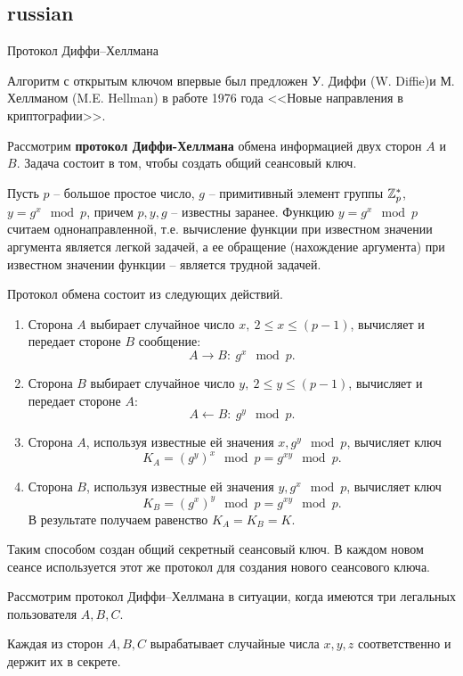 \subsection{russian}{Протокол Диффи--Хеллмана}

Алгоритм с открытым ключом впервые был предложен У. Диффи (W. Diffie)и М. Хеллманом (M.E. Hellman) в работе 1976 года <<Новые направления в криптографии>>.

Рассмотрим \textbf{протокол Диффи-Хеллмана} обмена информацией  двух сторон $A$ и $B$. Задача состоит в том, чтобы создать общий сеансовый ключ.

Пусть $p$ -- большое простое число, $g$ -- примитивный элемент группы $\mathbb{Z}_p^*$, ~ $y = g^x \mod p$, причем $p,y,g$ -- известны заранее. Функцию $y=g^{x} \mod p$ считаем однонаправленной, т.е. вычисление функции при известном значении аргумента является легкой задачей, а ее обращение (нахождение аргумента) при известном значении функции -- является трудной задачей.

Протокол обмена состоит из следующих действий.
\begin{enumerate}
    \item Сторона $A$ выбирает случайное число $x, ~ 2 \leq x \leq (p-1)$, вычисляет и передает стороне $B$ сообщение:
        \[ A \rightarrow B: ~ g^x \mod p. \]
    \item Сторона $B$ выбирает случайное число $y, ~ 2\leq y \leq (p-1)$, вычисляет и передает стороне $A$:
        \[ A \leftarrow B: ~ g^y \mod p. \]
    \item Сторона $A$, используя известные ей значения $x,g^{y} \mod p$, вычисляет ключ
        \[ K_{A} =(g^{y})^{x}\mod p=g^{xy} \mod p. \]
    \item Сторона $B$, используя известные ей значения $y,g^{x} \mod p$, вычисляет ключ
        \[ K_{B} =(g^{x})^{y}\mod p=g^{xy}\mod p. \]
        В результате получаем равенство  $K_A = K_B = K$.
\end{enumerate}

Таким способом создан общий секретный сеансовый ключ. В каждом новом сеансе используется этот же протокол для создания нового сеансового ключа.

Рассмотрим протокол Диффи--Хеллмана в ситуации, когда имеются три легальных пользователя $A,B,C$.

Каждая из сторон $A,B,C$ вырабатывает случайные числа $x,y,z$ соответственно и держит их в секрете.

